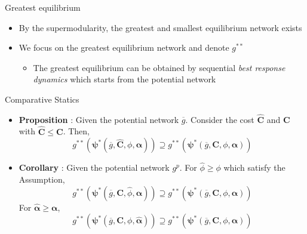 \documentclass[10pt,dvipdfmx]{beamer}
\begin{document}
\begin{frame}{Greatest equilibrium}
\begin{itemize}
    \item By the supermodularity, the greatest and smallest equilibrium network exists
    \item We focus on the greatest equilibrium network and denote $g^{**}$
    \begin{itemize}
        \item The greatest equilibrium can be obtained by sequential {\it{best response dynamics}} which starts from the potential network
    \end{itemize}
\end{itemize}
\end{frame}

\begin{frame}{Comparative Statics}
\begin{itemize}
    \item {\bf{Proposition}} : Given the potential network $\overline{g}$. Consider the cost $\bm{\hat{C}}$ and $\bm{C}$ with $\bm{\hat{C}} \le \bm{C}$. Then,
        \[ g^{**}(\bm{\psi}^*(\overline{g}, \bm{\hat{C}}, \phi, \bm{\alpha})) \supseteq g^{**}(\bm{\psi}^*(\overline{g}, \bm{C}, \phi, \bm{\alpha})) \]
    \item {\bf{Corollary}} : Given the potential network $g^p$. For $\hat{\phi} \ge \phi$ which satisfy the Assumption,
        \[ g^{**}(\bm{\psi}^*(\overline{g}, \bm{C}, \hat{\phi}, \bm{\alpha})) \supseteq g^{**}(\bm{\psi}^*(\overline{g}, \bm{C}, \phi, \bm{\alpha})) \]
        For $\bm{\hat{\alpha}} \ge \bm{\alpha}$,
        \[ g^{**}(\bm{\psi}^*(\overline{g}, \bm{C}, \phi, \bm{\hat{\alpha}})) \supseteq g^{**}(\bm{\psi}^*(\overline{g}, \bm{C}, \phi, \bm{\alpha})) \]
\end{itemize}
\end{frame}
\end{document}
